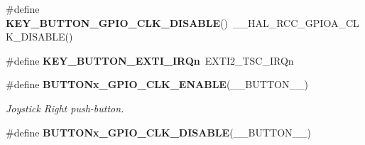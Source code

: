 \begin{DoxyCompactItemize}
\#define \textbf{ K\+E\+Y\+\_\+\+B\+U\+T\+T\+O\+N\+\_\+\+G\+P\+I\+O\+\_\+\+C\+L\+K\+\_\+\+D\+I\+S\+A\+B\+LE}()~\+\_\+\+\_\+\+H\+A\+L\+\_\+\+R\+C\+C\+\_\+\+G\+P\+I\+O\+A\+\_\+\+C\+L\+K\+\_\+\+D\+I\+S\+A\+B\+LE()
\item 
\#define \textbf{ K\+E\+Y\+\_\+\+B\+U\+T\+T\+O\+N\+\_\+\+E\+X\+T\+I\+\_\+\+I\+R\+Qn}~E\+X\+T\+I2\+\_\+\+T\+S\+C\+\_\+\+I\+R\+Qn
\item 
\#define \textbf{ B\+U\+T\+T\+O\+Nx\+\_\+\+G\+P\+I\+O\+\_\+\+C\+L\+K\+\_\+\+E\+N\+A\+B\+LE}(\+\_\+\+\_\+\+B\+U\+T\+T\+O\+N\+\_\+\+\_\+)
\begin{DoxyCompactList}\small\item\em Joystick Right push-\/button. \end{DoxyCompactList}\item 
\#define \textbf{ B\+U\+T\+T\+O\+Nx\+\_\+\+G\+P\+I\+O\+\_\+\+C\+L\+K\+\_\+\+D\+I\+S\+A\+B\+LE}(\+\_\+\+\_\+\+B\+U\+T\+T\+O\+N\+\_\+\+\_\+)
\end{DoxyCompactItemize}
